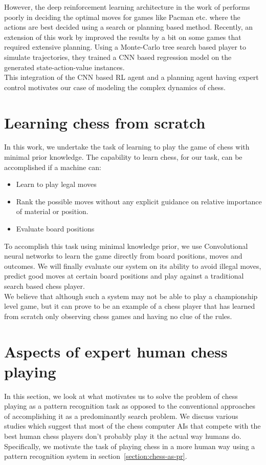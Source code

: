 However, the deep reinforcement learning architecture in the work of 
\citet{deepmind_nips} performs poorly in deciding the optimal moves for games 
like Pacman etc. where the actions are best decided using a search or planning 
based method. Recently, an extension of this work by \citet*{guo2014deep} 
improved the results by a bit on some games that required extensive 
planning. Using a Monte-Carlo tree search based player to simulate trajectories, 
they trained a CNN based regression model on the generated state-action-value 
instances.\\

This integration of the CNN based RL agent and a planning 
agent having expert control motivates our case of modeling the complex dynamics 
of chess.

\section{Learning chess from scratch}
In this work, we undertake the task of learning to play the game of chess with 
minimal prior knowledge. The capability to learn chess, for our task, can be 
accomplished if a machine can:
\begin{itemize}
 \item Learn to play legal moves
 \item Rank the possible moves without any explicit guidance on relative
    importance of material or position. 
 \item Evaluate board positions
\end{itemize}

To accomplish this task using minimal knowledge prior, we use Convolutional 
neural networks to learn the game directly from board positions, moves and 
outcomes. We will finally evaluate our system on its ability to avoid illegal 
moves, predict good moves at certain board positions and play against a 
traditional search based chess player.\\

We believe that although such a system may not be able to play a championship 
level game, but it can prove to be an example of a chess player that has 
learned from scratch only observing chess games and having no clue of the 
rules.


\section{Aspects of expert human chess playing}
In this section, we look at what motivates us to solve the problem of chess playing as a 
pattern recognition task as opposed to the conventional approaches of 
accomplishing it as a predominantly search problem. We discuss various 
studies which suggest that most of the chess computer AIs that compete with the 
best human chess players don't probably play it the actual way humans do. 
Specifically, we motivate the task of playing chess in a more human way using a 
pattern recognition system in section~\ref{section:chess-as-pr}.\\

